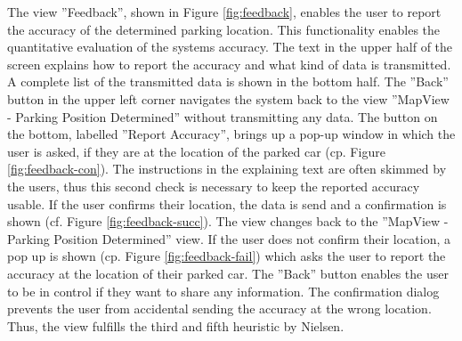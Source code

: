 The view ''Feedback'', shown in Figure \ref{fig:feedback}, enables the user to report the accuracy of the determined parking location. This functionality enables the quantitative evaluation of the systems accuracy. The text in the upper half of the screen explains how to report the accuracy and what kind of data is transmitted. A complete list of the transmitted data is shown in the bottom half. The ''Back'' button in the upper left corner navigates the system back to the view ''MapView - Parking Position Determined'' without transmitting any data. The button on the bottom, labelled ''Report Accuracy'', brings up a pop-up window in which the user is asked, if they are at the location of the parked car (cp. Figure \ref{fig:feedback-con}). The instructions in the explaining text are often skimmed by the users, thus this second check is necessary to keep the reported accuracy usable. If the user confirms their location, the data is send and a confirmation is shown (cf. Figure \ref{fig:feedback-succ}). The view changes back to the ''MapView - Parking Position Determined'' view. If the user does not confirm their location, a pop up is shown (cp. Figure \ref{fig:feedback-fail}) which asks the user to report the accuracy at the location of their parked car. The ''Back'' button enables the user to be in control if they want to share any information. The confirmation dialog prevents the user from accidental sending the accuracy at the wrong location. Thus, the view fulfills the third and fifth heuristic by Nielsen. \cite{nielsen1994usability} \newpage

